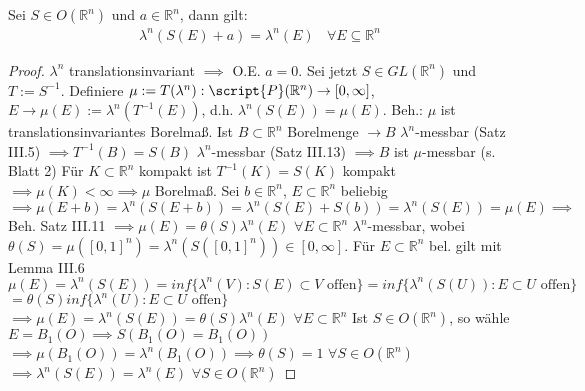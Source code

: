   \begin{theorem}
    Sei $S \in O(\mathbb{R}^n)$ und $a \in \mathbb{R}^n$, dann gilt:
    \begin{align*}
      \lambda^n(S(E) + a) = \lambda^n(E) \ \ \ \ \forall E \subseteq \mathbb{R}^n
    \end{align*}
  \end{theorem}

    \begin{proof}
	$\lambda^n$ translationsinvariant $\implies$ O.E. $a=0$. \newline
	Sei jetzt $S\in GL(\mathbb{R}^n)$ und $T:=S^{-1}$. \newline
	Definiere $\mu := T(\lambda^n): \script{P}(\mathbb{R}^n) \rightarrow [0,\infty]$, $E \to \mu(E) := \lambda^n(T^{-1}(E))$, d.h.\newline
	$\lambda^n(S(E)) = \mu(E)$. \newline
	Beh.: $\mu$ ist translationsinvariantes Borelmaß. \newline
	Ist $B\subset\mathbb{R}^n$ Borelmenge $\rightarrow B$ $\lambda^n$-messbar (Satz III.5) $\implies T^{-1}(B) = S(B)$ $\lambda^n$-messbar (Satz III.13) $\implies B$ ist $\mu$-messbar (s. Blatt 2) \newline
	Für $K\subset\mathbb{R}^n$ kompakt ist $T^{-1}(K) = S(K)$ kompakt $\implies \mu(K) < \infty \implies \mu$ Borelmaß. \newline
	Sei $b\in\mathbb{R}^n$, $E\subset\mathbb{R}^n$ beliebig \newline 
	$\implies \mu(E+b) = \lambda^n(S(E+b)) = \lambda^n(S(E) + S(b)) = \lambda^n(S(E)) = \mu(E) \implies$ Beh. \newline
	Satz III.11 $\implies \mu(E) = \theta(S) \lambda^n(E)$ $\forall E\subset\mathbb{R}^n$ $\lambda^n$-messbar, wobei $\theta(S) = \mu([0,1]^n) = \lambda^n(S([0,1]^n)) \in [0,\infty]$. \newline
	Für $E\subset\mathbb{R}^n$ bel. gilt mit Lemma III.6 \newline
	$\mu(E) = \lambda^n(S(E)) = inf\{\lambda^n(V): S(E)\subset V \text{ offen}\} = inf\{\lambda^n(S(U)): E\subset U \text{ offen}\}$ \newline $= \theta(S) inf\{\lambda^n(U): E\subset U \text{ offen}\}$ \newline
	$\implies \mu(E) = \lambda^n(S(E)) = \theta(S) \lambda^n(E)$ $\forall E\subset\mathbb{R}^n$ \newline
	Ist $S\in O(\mathbb{R}^n)$, so wähle $E = B_1(O) \implies S(B_1(O) = B_1(O))$ \newline
	$\implies \mu(B_1(O)) = \lambda^n(B_1(O)) \implies \theta(S) = 1$ $\forall S\in O(\mathbb{R}^n)$ \newline
	$\implies \lambda^n(S(E)) = \lambda^n(E)$ $\forall S \in O(\mathbb{R}^n)$
\end{proof}

